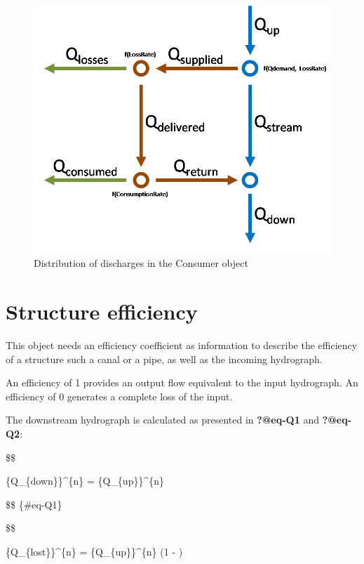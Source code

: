 \documentclass[
  letterpaper,
  DIV=11,
  numbers=noendperiod]{scrreprt}
\begin{document}
\begin{figure}

{\centering \includegraphics{./figures/fig-model_consumer.png}

}

\caption{\label{fig-model_consumer}Distribution of discharges in the
Consumer object}

\end{figure}

\hypertarget{sec-model_efficiency}{%
\chapter{Structure efficiency}\label{sec-model_efficiency}}

This object needs an efficiency coefficient as information to describe
the efficiency of a structure such a canal or a pipe, as well as the
incoming hydrograph.

An efficiency of 1 provides an output flow equivalent to the input
hydrograph. An efficiency of 0 generates a complete loss of the input.

The downstream hydrograph is calculated as presented in \textbf{?@eq-Q1}
and \textbf{?@eq-Q2}:

\$\$

\{Q\_\{down\}\}\^{}\{n\} = \{Q\_\{up\}\}\^{}\{n\}
\cdot {}

\$\$ \{\#eq-Q1\}

\$\$

\{Q\_\{lost\}\}\^{}\{n\} = \{Q\_\{up\}\}\^{}\{n\} \cdot (1 -
)
\end{document}
